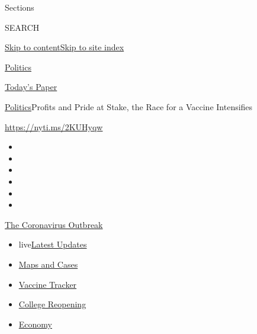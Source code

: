 Sections

SEARCH

\protect\hyperlink{site-content}{Skip to
content}\protect\hyperlink{site-index}{Skip to site index}

\href{https://www.nytimes.com/section/politics}{Politics}

\href{https://myaccount.nytimes.com/auth/login?response_type=cookie\&client_id=vi}{}

\href{https://www.nytimes.com/section/todayspaper}{Today's Paper}

\href{/section/politics}{Politics}\textbar{}Profits and Pride at Stake,
the Race for a Vaccine Intensifies

\url{https://nyti.ms/2KUHyqw}

\begin{itemize}
\item
\item
\item
\item
\item
\item
\end{itemize}

\href{https://www.nytimes.com/news-event/coronavirus?action=click\&pgtype=Article\&state=default\&region=TOP_BANNER\&context=storylines_menu}{The
Coronavirus Outbreak}

\begin{itemize}
\tightlist
\item
  live\href{https://www.nytimes.com/2020/08/04/world/coronavirus-cases.html?action=click\&pgtype=Article\&state=default\&region=TOP_BANNER\&context=storylines_menu}{Latest
  Updates}
\item
  \href{https://www.nytimes.com/interactive/2020/us/coronavirus-us-cases.html?action=click\&pgtype=Article\&state=default\&region=TOP_BANNER\&context=storylines_menu}{Maps
  and Cases}
\item
  \href{https://www.nytimes.com/interactive/2020/science/coronavirus-vaccine-tracker.html?action=click\&pgtype=Article\&state=default\&region=TOP_BANNER\&context=storylines_menu}{Vaccine
  Tracker}
\item
  \href{https://www.nytimes.com/2020/08/02/us/covid-college-reopening.html?action=click\&pgtype=Article\&state=default\&region=TOP_BANNER\&context=storylines_menu}{College
  Reopening}
\item
  \href{https://www.nytimes.com/live/2020/08/04/business/stock-market-today-coronavirus?action=click\&pgtype=Article\&state=default\&region=TOP_BANNER\&context=storylines_menu}{Economy}
\end{itemize}

